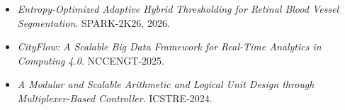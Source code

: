 
\begin{itemize}
\item \textit{Entropy-Optimized Adaptive Hybrid Thresholding for Retinal Blood Vessel Segmentation}. SPARK-2K26, 2026.
\item \textit{CityFlow: A Scalable Big Data Framework for Real-Time Analytics in Computing 4.0}. NCCENGT-2025.
\item \textit{A Modular and Scalable Arithmetic and Logical Unit Design through Multiplexer-Based Controller}. ICSTRE-2024.
\end{itemize}
